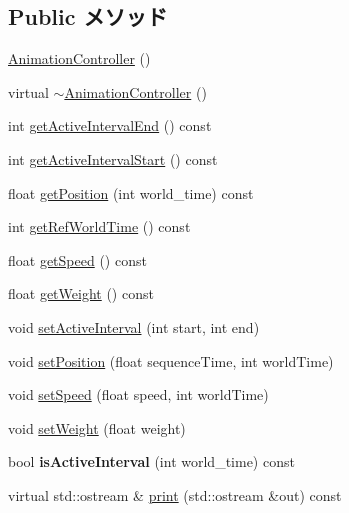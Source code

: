 \subsection*{Public メソッド}
\begin{CompactItemize}
\item 
\hyperlink{classm3g_1_1AnimationController_f2e8cb2c6c916983d0f87140c7b0c98e}{AnimationController} ()
\item 
virtual \hyperlink{classm3g_1_1AnimationController_346849d0f82278f30dda9f35f80e9dbe}{$\sim$AnimationController} ()
\item 
int \hyperlink{classm3g_1_1AnimationController_7caa95c7ed5a03844abe328feaae4911}{getActiveIntervalEnd} () const 
\item 
int \hyperlink{classm3g_1_1AnimationController_c66e837ae4152477eabdfcbe7fb21adb}{getActiveIntervalStart} () const 
\item 
float \hyperlink{classm3g_1_1AnimationController_dfdea73153cb34c26979575efda149e2}{getPosition} (int world\_\-time) const 
\item 
int \hyperlink{classm3g_1_1AnimationController_103e1bd81eba2cc90f31e7fdc4f3c601}{getRefWorldTime} () const 
\item 
float \hyperlink{classm3g_1_1AnimationController_4ab87c5df7c3eadd17b318a426773fcb}{getSpeed} () const 
\item 
float \hyperlink{classm3g_1_1AnimationController_a17d38dafd3d75c59f0609f037fbe5ae}{getWeight} () const 
\item 
void \hyperlink{classm3g_1_1AnimationController_a4cba877288d7a188477e0a756fd2f58}{setActiveInterval} (int start, int end)
\item 
void \hyperlink{classm3g_1_1AnimationController_a20a5553bd449b21bad74666055626f0}{setPosition} (float sequenceTime, int worldTime)
\item 
void \hyperlink{classm3g_1_1AnimationController_403dae9658751ff86becd82d8a6477f2}{setSpeed} (float speed, int worldTime)
\item 
void \hyperlink{classm3g_1_1AnimationController_8859df4d5a61714012bf9e1240189aed}{setWeight} (float weight)
\item 
\hypertarget{classm3g_1_1AnimationController_8db30a5f125f5b22a1cde9e41d93c2f0}{
bool \textbf{isActiveInterval} (int world\_\-time) const }
\label{classm3g_1_1AnimationController_8db30a5f125f5b22a1cde9e41d93c2f0}

\item 
virtual std::ostream \& \hyperlink{classm3g_1_1AnimationController_6fea17fa1532df3794f8cb39cb4f911f}{print} (std::ostream \&out) const 
\end{CompactItemize}


